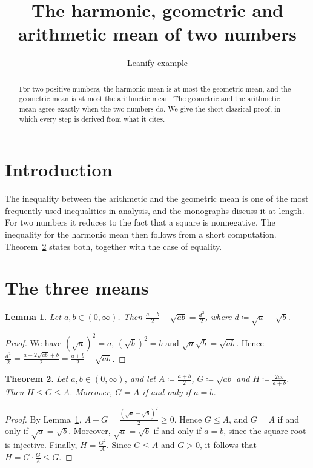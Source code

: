 \documentclass{article}
\title{The harmonic, geometric and arithmetic mean of two numbers}
\author{Leanify example}
\date{}
\newtheorem{theorem}{Theorem}
\newtheorem{lemma}[theorem]{Lemma}
\theoremstyle{remark}
\begin{document}
\maketitle

\begin{abstract}
For two positive numbers, the harmonic mean is at most the geometric mean, and the geometric mean is at most the arithmetic mean.
The geometric and the arithmetic mean agree exactly when the two numbers do.
We give the short classical proof, in which every step is derived from what it cites.
\end{abstract}

\section{Introduction}

The inequality between the arithmetic and the geometric mean is one of the most frequently used inequalities in analysis, and the monographs \cite{hardy1952inequalities,steele2004cauchy} discuss it at length.
For two numbers it reduces to the fact that a square is nonnegative.
The inequality for the harmonic mean then follows from a short computation.
Theorem~\ref{thm:means} states both, together with the case of equality.

\section{The three means}

\begin{lemma}\label{lem:square}
Let $a,b\in(0,\infty)$.
Then $\frac{a+b}{2}-\sqrt{ab}=\frac{d^2}{2}$, where $d\coloneqq\sqrt a-\sqrt b$.
\end{lemma}

\begin{proof}
We have $(\sqrt a)^2=a$, $(\sqrt b)^2=b$ and $\sqrt a\sqrt b=\sqrt{ab}$.
Hence $\frac{d^2}{2}=\frac{a-2\sqrt{ab}+b}{2}=\frac{a+b}{2}-\sqrt{ab}$.
\end{proof}

\begin{theorem}\label{thm:means}
Let $a,b\in(0,\infty)$, and let $A\coloneqq\frac{a+b}{2}$, $G\coloneqq\sqrt{ab}$ and $H\coloneqq\frac{2ab}{a+b}$.
Then $H\le G\le A$.
Moreover, $G=A$ if and only if $a=b$.
\end{theorem}

\begin{proof}
By Lemma~\ref{lem:square}, $A-G=\frac{(\sqrt a-\sqrt b)^2}{2}\ge0$.
Hence $G\le A$, and $G=A$ if and only if $\sqrt a=\sqrt b$.
Moreover, $\sqrt a=\sqrt b$ if and only if $a=b$, since the square root is injective.
Finally, $H=\frac{G^2}{A}$.
Since $G\le A$ and $G>0$, it follows that $H=G\cdot\frac{G}{A}\le G$.
\end{proof}
\end{document}
